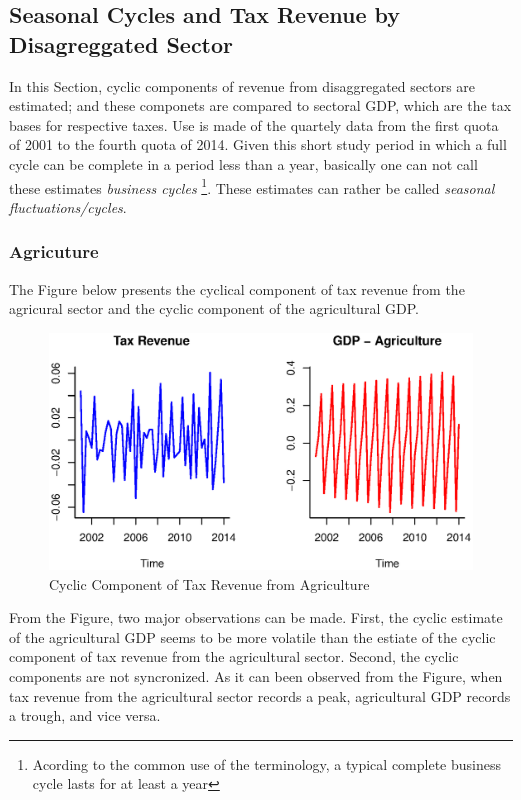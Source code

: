 \documentclass[12pt,a4paper,final]{article}
\begin{document}
\subsection{Seasonal Cycles and Tax Revenue by Disagreggated Sector}
In this Section, cyclic components of revenue from disaggregated sectors are estimated; and these componets are compared to sectoral GDP, which are the tax bases for respective taxes.  Use is made of the quartely data from the first quota of 2001 to the fourth quota of 2014. Given this short study  period in which a full cycle can be complete in a period less than a year, basically one can not call these estimates \textit{business cycles} \footnote{Acording to the common use of the terminology, a typical complete business cycle lasts for at least a year}. These estimates can rather be called \textit{seasonal fluctuations/cycles}.

\subsubsection{Agricuture}

The Figure below presents the cyclical component of tax revenue from the agricural sector and the cyclic component of the agricultural GDP.

\begin{figure}[ht]
\centering
\begin{small}
\caption{Cyclic Component of Tax Revenue from Agriculture}
\end{small}
\includegraphics[scale=0.601]{agric.eps} 
\end{figure}

From the Figure, two major observations can be made. First, the cyclic estimate of the agricultural GDP seems to be more volatile than the estiate of the cyclic component of tax revenue from the agricultural sector. Second, the cyclic components are not syncronized.  As it can been observed from the Figure, when tax revenue from the agricultural sector records a peak, agricultural GDP records a trough, and vice versa.
\end{document}
